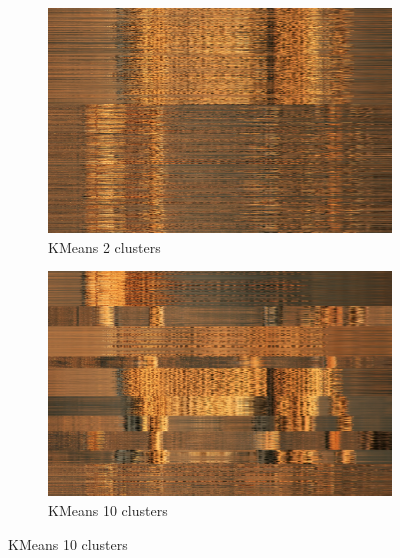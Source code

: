 \documentclass{article}
\begin{document}
\begin{figure}[H]
\begin{subfigure}{.5\textwidth}
  \centering
\includegraphics[scale=0.15]{kmeans_2.png}
  \caption{KMeans 2 clusters}
  \label{fig:sfig1}
\end{subfigure}
\begin{subfigure}{.5\textwidth}
  \centering
\includegraphics[scale=0.15]{kmeans_10.png}
  \caption{KMeans 10 clusters}
  \label{fig:sfig2}
\end{subfigure}


\end{figure}
\end{document}
